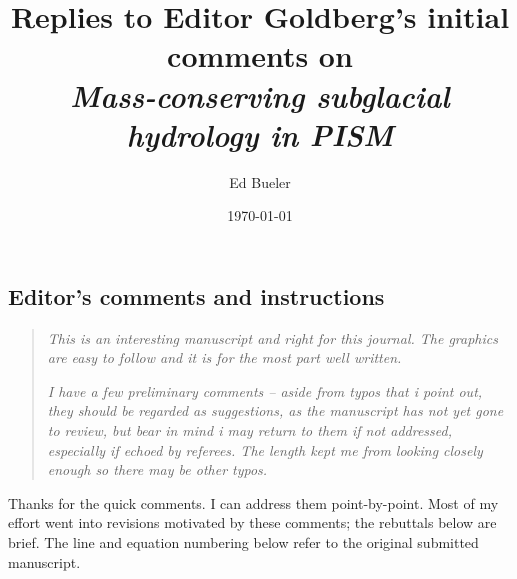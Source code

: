\documentclass[11pt,reqno]{amsart}
\title[Replies to Editor Goldberg's comments]{Replies to Editor Goldberg's initial comments on \\ \emph{Mass-conserving subglacial hydrology in PISM}}
\author{Ed Bueler}
\date{\today}
\begin{document}
\maketitle

\thispagestyle{empty}



\subsection*{Editor's comments and instructions}  \begin{quote}
\emph{This is an interesting manuscript and right for this journal. The graphics are easy to follow and it is for the most part well written.}

\emph{I have a few preliminary comments -- aside from typos that i point out, they should be regarded as suggestions, as the manuscript has not yet gone to review, but bear in mind i may return to them if not addressed, especially if echoed by referees. The length kept me from looking closely enough so there may be other typos.}
\end{quote}

\medskip
\noindent Thanks for the quick comments.  I can address them point-by-point.  Most of my effort went into revisions motivated by these comments; the rebuttals below are brief.   The line and equation numbering below refer to the original submitted manuscript.
\end{document}

